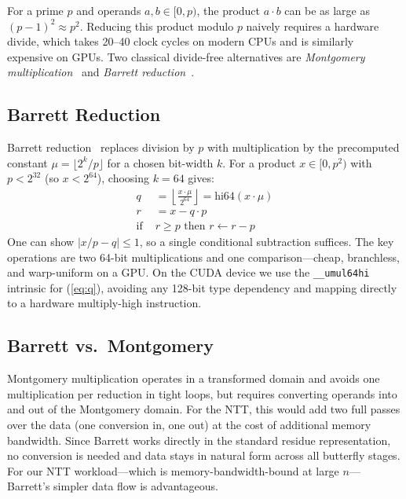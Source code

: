 \documentclass[conference]{IEEEtran}
\begin{document}
For a prime $p$ and operands $a, b \in [0, p)$, the product $a \cdot b$ can be as large as
$(p-1)^2 \approx p^2$. Reducing this product modulo $p$ naively requires a hardware divide, which
takes 20--40 clock cycles on modern CPUs and is similarly expensive on GPUs. Two classical
divide-free alternatives are \emph{Montgomery multiplication}~\cite{montgomery} and
\emph{Barrett reduction}~\cite{barrett}.

\subsection{Barrett Reduction}

Barrett reduction~\cite{barrett} replaces division by $p$ with multiplication by the precomputed
constant $\mu = \lfloor 2^k / p \rfloor$ for a chosen bit-width $k$. For a product
$x \in [0, p^2)$ with $p < 2^{32}$ (so $x < 2^{64}$), choosing $k = 64$ gives:
\begin{align}
  q &= \left\lfloor \frac{x \cdot \mu}{2^{64}} \right\rfloor
    = \text{hi64}(x \cdot \mu) \label{eq:q} \\
  r &= x - q \cdot p \label{eq:r} \\
  \text{if } &r \ge p \text{ then } r \leftarrow r - p \label{eq:correct}
\end{align}
One can show $|x/p - q| \le 1$, so a single conditional subtraction suffices. The key operations
are two 64-bit multiplications and one comparison—cheap, branchless, and warp-uniform on a GPU.
On the CUDA device we use the \texttt{\_\_umul64hi} intrinsic for (\ref{eq:q}), avoiding any
128-bit type dependency and mapping directly to a hardware multiply-high instruction.

\subsection{Barrett vs.\ Montgomery}

Montgomery multiplication operates in a transformed domain and avoids one multiplication per
reduction in tight loops, but requires converting operands into and out of the Montgomery domain.
For the NTT, this would add two full passes over the data (one conversion in, one out) at the cost
of additional memory bandwidth. Since Barrett works directly in the standard residue representation,
no conversion is needed and data stays in natural form across all butterfly stages. For our NTT
workload—which is memory-bandwidth-bound at large $n$—Barrett's simpler data flow is advantageous.
\end{document}
